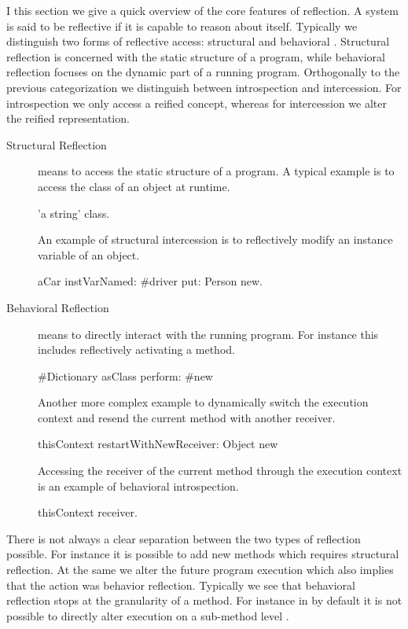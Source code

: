 I this section we give a quick overview of the core features of reflection.
A system is said to be reflective if it is capable to reason about itself.
Typically we distinguish two forms of reflective access: structural and behavioral \cite{Maes87a}.
Structural reflection is concerned with the static structure of a program, while behavioral reflection focuses on the dynamic part of a running program.
Orthogonally to the previous categorization we distinguish between introspection and intercession. 
For introspection we only access a reified concept, whereas for intercession we alter the reified representation.

\begin{description}
\item[Structural Reflection] means to access the static structure of a program.
A typical example is to access the class of an object at runtime.
\begin{stcode}{}
'a string' class.
\end{stcode}
An example of structural intercession is to reflectively modify an instance variable of an object.
\begin{stcode}{}
aCar instVarNamed: #driver put: Person new.
\end{stcode}

\item[Behavioral Reflection] means to directly interact with the running program.
For instance this includes reflectively activating a method.
\begin{stcode}{}
#Dictionary asClass perform: #new
\end{stcode}
%
Another more complex example to dynamically switch the execution context and resend the current method with another receiver.
\begin{stcode}{}
thisContext restartWithNewReceiver: Object new 
\end{stcode}

Accessing the receiver of the current method through the execution context is an example of behavioral introspection.
\begin{stcode}{}
thisContext receiver. 
\end{stcode}
\end{description}

\noindent There is not always a clear separation between the two types of reflection possible.
For instance it is possible to add new methods which requires structural reflection.
At the same we alter the future program execution which also implies that the action was behavior reflection.
Typically we see that behavioral reflection stops at the granularity of a method.
For instance in \PH by default it is not possible to directly alter execution on a sub-method level \cite{Denk06a}.

